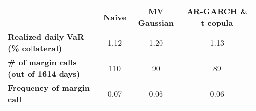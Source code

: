 \begin{small}\begin{tabular}{ l c c c }
&\textbf{Naive}&\textbf{MV Gaussian}&\textbf{AR-GARCH \& t copula}\\
\textbf{Realized daily VaR (\% collateral)}&1.12&1.20&1.13\\
\textbf{\# of margin calls (out of 1614 days)}&110&90&89\\
\textbf{Frequency of margin call}&0.07&0.06&0.06\\
\end{tabular}
\end{small}
